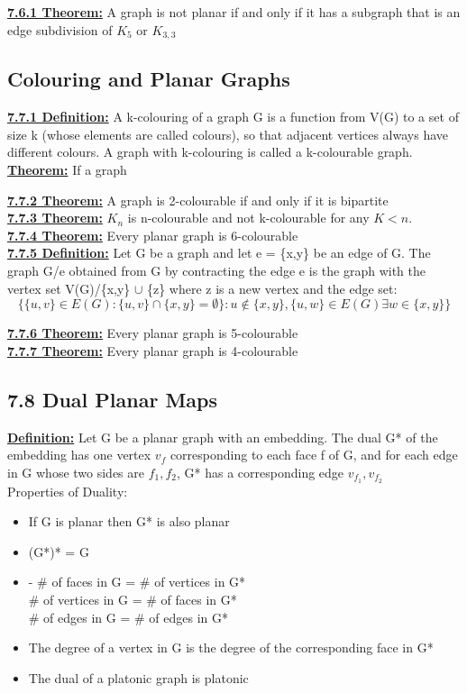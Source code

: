\documentclass[12pt]{article}
\newcommand{\myt}[1]{\textbf{\underline{#1}}}
\begin{document}
	\myt{7.6.1 Theorem:} A graph is not planar if and only if it has a subgraph that is an edge subdivision of $K_5$ or $K_{3,3}$\\
	
	\subsection*{Colouring and Planar Graphs}
	\myt{7.7.1 Definition:} A k-colouring of a graph G is a function from V(G) to a set of size k (whose elements are called colours), so that adjacent vertices always have different colours. A graph with k-colouring is called a k-colourable graph.\\
	
	\myt{Theorem:} If a graph 
	
	\myt{7.7.2 Theorem:} A graph is 2-colourable if and only if it is bipartite\\
	
	\myt{7.7.3 Theorem:} $K_n$ is n-colourable and not k-colourable for any $K < n$.\\
	
	\myt{7.7.4 Theorem:} Every planar graph is 6-colourable\\
	
	\myt{7.7.5 Definition:} Let G be a graph and let e = \{x,y\} be an edge of G. The graph G/e obtained from G by contracting the edge e is the graph with the vertex set V(G)/\{x,y\} $\cup$ \{z\} where z is a new vertex and the edge set:\\
	$$\{\{u,v\} \in E(G) : \{u,v\} \cap \{x,y\} = \emptyset\}: u \notin \{x,y\},\{u,w\} \in E(G) \exists w \in \{x,y\}\}$$
	
	\myt{7.7.6 Theorem:} Every planar graph is 5-colourable\\
	
	\myt{7.7.7 Theorem:} Every planar graph is 4-colourable\\

	\subsection*{7.8 Dual Planar Maps}
	\myt{Definition:} Let G be a planar graph with an embedding. The dual G* of the embedding has one vertex $v_f$ corresponding to each face f of G, and for each edge in G whose two sides are $f_1, f_2$, G* has a corresponding edge $v_{f_1}, v_{f_2}$\\
	
	Properties of Duality:\\
	\begin{itemize}
		\item If G is planar then G* is also planar
		\item (G*)* = G
		\item - \# of faces in G = \# of vertices in G*\\
		\# of vertices in G = \# of faces in G*\\
		\# of edges in G = \# of edges in G*
		\item The degree of a vertex in G is the degree of the corresponding face in G*
		\item The dual of a platonic graph is platonic
	\end{itemize}
	
\end{document}
